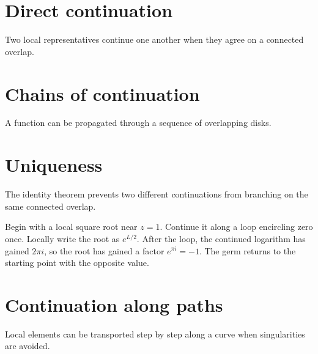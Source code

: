 \section{Direct continuation}
Two local representatives continue one another when they agree on a connected overlap.

\section{Chains of continuation}
A function can be propagated through a sequence of overlapping disks.

\section{Uniqueness}
The identity theorem prevents two different continuations from branching on the same connected overlap.

\begin{example}\label{ex:iv15-expand-02}
Begin with a local square root near \(z=1\). Continue it along a loop encircling zero once. Locally write the root as \(e^{L/2}\). After the loop, the continued logarithm has gained \(2\pi i\), so the root has gained a factor \(e^{\pi i}=-1\). The germ returns to the starting point with the opposite value.
\end{example}
\section{Continuation along paths}
Local elements can be transported step by step along a curve when singularities are avoided.

